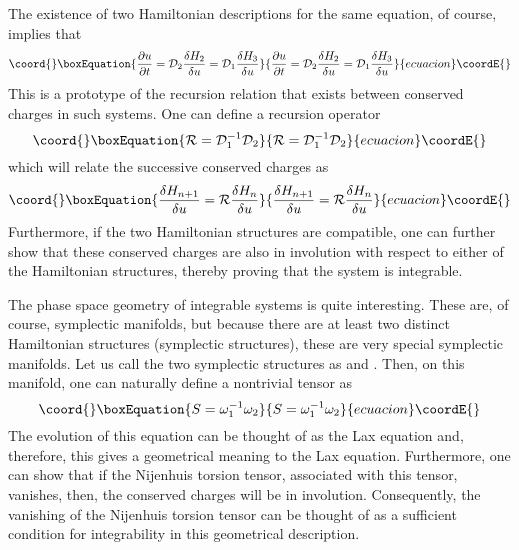 \documentclass[a4paper,11pt]{article}
\begin{document}
The existence of two Hamiltonian descriptions for the same equation,
of course, implies that
\begin{equation}\coord{}\boxEquation{
{\partial u\over \partial t} = {\cal D}_{2} {\delta H_{2}\over \delta
u} = {\cal D}_{1} {\delta H_{3}\over \delta u}
}{
{\partial u\over \partial t} = {\cal D}_{2} {\delta H_{2}\over \delta
u} = {\cal D}_{1} {\delta H_{3}\over \delta u}
}{ecuacion}\coordE{}\end{equation}
This is a prototype of the recursion relation that exists between
conserved charges in such systems. One can define a recursion operator
\begin{equation}\coord{}\boxEquation{
{\cal R} = {\cal D}_{1}^{-1} {\cal D}_{2}
}{
{\cal R} = {\cal D}_{1}^{-1} {\cal D}_{2}
}{ecuacion}\coordE{}\end{equation}
which will relate the successive conserved charges as
\begin{equation}\coord{}\boxEquation{
{\delta H_{n+1}\over \delta u} = {\cal R} {\delta H_{n}\over \delta u}
}{
{\delta H_{n+1}\over \delta u} = {\cal R} {\delta H_{n}\over \delta u}
}{ecuacion}\coordE{}\end{equation}
Furthermore, if the two Hamiltonian structures are compatible, one can
further show that these conserved charges are also in involution with
respect to either of the Hamiltonian structures, thereby proving that
the system is integrable.

The phase space geometry of integrable systems is quite
interesting. These are, of course, symplectic manifolds, but because
there are at least two distinct Hamiltonian structures (symplectic
structures), these are very special symplectic manifolds. Let us call
the two symplectic structures as \coordHE{} and \coordHE{}. Then,
on this manifold, one can naturally define a nontrivial \coordHE{} tensor
as
\begin{equation}\coord{}\boxEquation{
S = \omega_{1}^{-1} \omega_{2}
}{
S = \omega_{1}^{-1} \omega_{2}
}{ecuacion}\coordE{}\end{equation}
The evolution of this equation can be thought of as the Lax equation
and, therefore, this gives a geometrical meaning to the Lax
equation. Furthermore, one can show that if the Nijenhuis torsion
tensor, associated with this \coordHE{} tensor, vanishes, then, the
conserved charges will be in involution. Consequently, the vanishing
of the Nijenhuis torsion tensor can be thought of as a sufficient
condition for integrability in this geometrical description.  
\end{document}
